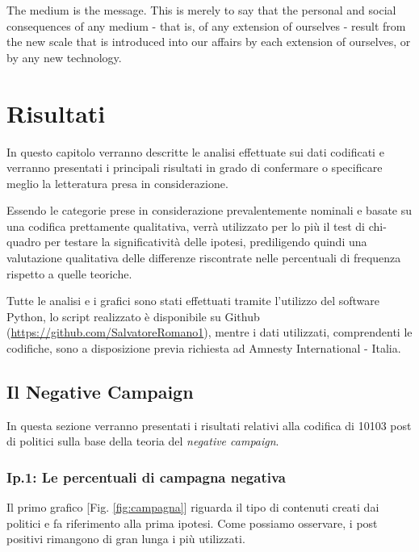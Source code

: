 
\begin{savequote}[75mm]
	The medium is the message. This is merely to say that the personal and social consequences of any medium - that is, of any extension of ourselves - result from the new scale that is introduced into our affairs by each extension of ourselves, or by any new technology.
\end{savequote}



\chapter{Risultati}
\label{chap:risultati}

In questo capitolo verranno descritte le analisi effettuate sui dati codificati e verranno presentati i principali risultati in grado di confermare o specificare meglio la letteratura presa in considerazione.

Essendo le categorie prese in considerazione prevalentemente nominali e basate su una codifica prettamente qualitativa, verrà utilizzato per lo più il test di chi-quadro per testare la significatività delle ipotesi, prediligendo quindi una valutazione qualitativa delle differenze riscontrate nelle percentuali di frequenza rispetto a quelle teoriche.

Tutte le analisi e i grafici sono stati effettuati tramite l'utilizzo del software Python, lo script realizzato è disponibile su Github (\url{https://github.com/SalvatoreRomano1}), mentre i dati utilizzati, comprendenti le codifiche, sono a disposizione previa richiesta ad Amnesty International - Italia. 

\section{Il Negative Campaign}
In questa sezione verranno presentati i risultati relativi alla codifica di 10103 post di politici sulla base della teoria del \textit{negative campaign}.

\subsection{Ip.1: Le percentuali di campagna negativa}
Il primo grafico [Fig. \ref{fig:campagna}] riguarda il tipo di contenuti creati dai politici e fa riferimento alla prima ipotesi. Come possiamo osservare, i post positivi rimangono di gran lunga i più utilizzati.


